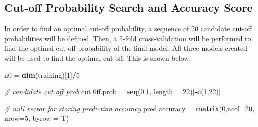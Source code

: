 \documentclass[
]{article}
\newenvironment{Shaded}{\begin{snugshade}}{\end{snugshade}}
\newcommand{\AttributeTok}[1]{\textcolor[rgb]{0.13,0.29,0.53}{#1}}
\newcommand{\CommentTok}[1]{\textcolor[rgb]{0.56,0.35,0.01}{\textit{#1}}}
\newcommand{\DecValTok}[1]{\textcolor[rgb]{0.00,0.00,0.81}{#1}}
\newcommand{\FloatTok}[1]{\textcolor[rgb]{0.00,0.00,0.81}{#1}}
\newcommand{\FunctionTok}[1]{\textcolor[rgb]{0.13,0.29,0.53}{\textbf{#1}}}
\newcommand{\NormalTok}[1]{#1}
\newcommand{\OtherTok}[1]{\textcolor[rgb]{0.56,0.35,0.01}{#1}}
\newcommand{\SpecialCharTok}[1]{\textcolor[rgb]{0.81,0.36,0.00}{\textbf{#1}}}
\begin{document}
\subsection{Cut-off Probability Search and Accuracy
Score}\label{cut-off-probability-search-and-accuracy-score}

In order to find an optimal cut-off probability, a sequence of 20
candidate cut-off probabilities will be defined. Then, a 5-fold
cross-validation will be performed to find the optimal cut-off
probability of the final model. All three models created will be used to
find the optimal cut-off. This is shown below.

\begin{Shaded}
\begin{Highlighting}[]
\NormalTok{n0 }\OtherTok{=} \FunctionTok{dim}\NormalTok{(training)[}\DecValTok{1}\NormalTok{]}\SpecialCharTok{/}\DecValTok{5}

\CommentTok{\# candidate cut off prob}
\NormalTok{cut}\FloatTok{.0}\NormalTok{ff.prob }\OtherTok{=} \FunctionTok{seq}\NormalTok{(}\DecValTok{0}\NormalTok{,}\DecValTok{1}\NormalTok{, }\AttributeTok{length =} \DecValTok{22}\NormalTok{)[}\SpecialCharTok{{-}}\FunctionTok{c}\NormalTok{(}\DecValTok{1}\NormalTok{,}\DecValTok{22}\NormalTok{)]}

\CommentTok{\# null vector for storing prediction accuracy}
\NormalTok{pred.accuracy }\OtherTok{=} \FunctionTok{matrix}\NormalTok{(}\DecValTok{0}\NormalTok{,}\AttributeTok{ncol=}\DecValTok{20}\NormalTok{, }\AttributeTok{nrow=}\DecValTok{5}\NormalTok{, }\AttributeTok{byrow =}\NormalTok{ T)}


\end{Highlighting}
\end{Shaded}
\end{document}

